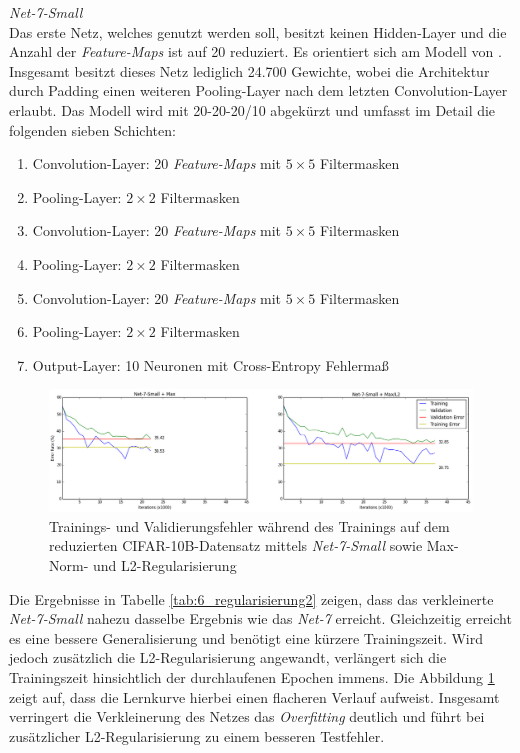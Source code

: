 \textit{Net-7-Small} \\
Das erste Netz, welches genutzt werden soll, besitzt keinen Hidden-Layer und die Anzahl der \textit{Feature-Maps} ist auf 20 reduziert. Es orientiert sich am Modell von \cite{Kaparthy2014}. Insgesamt besitzt dieses Netz lediglich 24.700 Gewichte, wobei die Architektur durch Padding einen weiteren Pooling-Layer nach dem letzten Convolution-Layer erlaubt.
Das Modell wird mit 20-20-20/10 abgekürzt und umfasst im Detail die folgenden sieben Schichten:
\begin{enumerate}
\setlength{\itemsep}{0pt}
\item Convolution-Layer: 20 \textit{Feature-Maps} mit $5 \times 5$ Filtermasken
\item Pooling-Layer:	$2 \times 2$ Filtermasken
\item Convolution-Layer: 20 \textit{Feature-Maps} mit $5 \times 5$ Filtermasken
\item Pooling-Layer:	$2 \times 2$ Filtermasken
\item Convolution-Layer: 20 \textit{Feature-Maps} mit $5 \times 5$ Filtermasken
\item Pooling-Layer:	$2 \times 2$ Filtermasken
\item Output-Layer: 10 Neuronen mit Cross-Entropy Fehlermaß
\end{enumerate}



\begin{figure}
\centering
\includegraphics[width=0.7\linewidth]{images/6_overfit_small_2}
\caption[]{Trainings- und Validierungsfehler während des Trainings auf dem reduzierten CIFAR-10B-Datensatz mittels \textit{Net-7-Small} sowie Max-Norm- und L2-Regularisierung}
\label{fig:6_overfit_small}
\end{figure}

Die Ergebnisse in Tabelle \ref{tab:6_regularisierung2} zeigen, dass das verkleinerte \textit{Net-7-Small} nahezu dasselbe Ergebnis wie das \textit{Net-7} erreicht. Gleichzeitig erreicht es eine bessere Generalisierung und benötigt eine kürzere Trainingszeit. Wird jedoch zusätzlich die L2-Regularisierung angewandt, verlängert sich die Trainingszeit hinsichtlich der durchlaufenen Epochen immens. Die Abbildung \ref{fig:6_overfit_small} zeigt auf, dass die Lernkurve hierbei einen flacheren Verlauf aufweist. Insgesamt verringert die Verkleinerung des Netzes das \textit{Overfitting} deutlich und führt bei zusätzlicher L2-Regularisierung zu einem besseren Testfehler.\\


